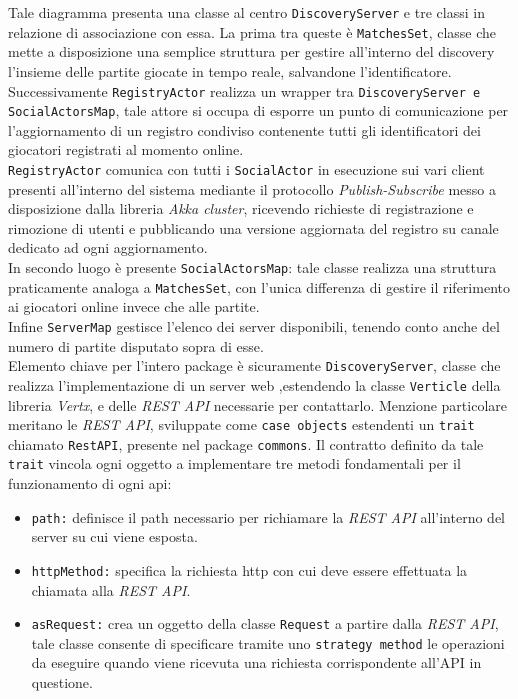 Tale diagramma presenta una classe al centro \texttt{DiscoveryServer} e tre classi in relazione di associazione con essa.
La prima tra queste è \texttt{MatchesSet}, classe che mette a disposizione una semplice struttura per gestire all'interno del discovery l'insieme delle partite giocate in tempo reale, salvandone l'identificatore.\\
Successivamente \texttt{RegistryActor} realizza un wrapper tra \texttt{DiscoveryServer e SocialActorsMap}, tale attore si occupa di esporre un punto di comunicazione per l'aggiornamento di un registro condiviso contenente tutti gli identificatori dei giocatori registrati al momento online.\\ \texttt{RegistryActor} comunica con tutti i \texttt{SocialActor} in esecuzione sui vari client presenti all'interno del sistema mediante il protocollo \textit{Publish-Subscribe} messo a disposizione dalla libreria \textit{Akka cluster}, ricevendo richieste di registrazione e rimozione di utenti e pubblicando una versione aggiornata del registro su canale dedicato ad ogni aggiornamento.\\
In secondo luogo è presente \texttt{SocialActorsMap}: tale classe realizza una struttura praticamente analoga a \texttt{MatchesSet}, con l'unica differenza di gestire il riferimento ai giocatori online invece che alle partite.\\
Infine \texttt{ServerMap} gestisce l'elenco dei server disponibili, tenendo conto anche del numero di partite disputato sopra di esse.\\
Elemento chiave per l'intero package è sicuramente \texttt{DiscoveryServer}, classe che realizza l'implementazione di un server web ,estendendo la classe \texttt{Verticle} della libreria \textit{Vertx}, e delle \textit{REST API} necessarie per contattarlo.
Menzione particolare meritano le \textit{REST API}, sviluppate come \texttt{case objects} estendenti un \texttt{trait} chiamato \texttt{RestAPI}, presente nel package \texttt{commons}. Il contratto definito da tale \texttt{trait} vincola ogni oggetto a implementare tre metodi fondamentali per il funzionamento di ogni api:
\begin{itemize}
  \item{\texttt{path:}} definisce il path necessario per richiamare la \textit{REST API} all'interno del server su cui viene esposta.

  \item{\texttt{httpMethod:}} specifica la richiesta http con cui deve essere effettuata la chiamata alla \textit{REST API}.

  \item{\texttt{asRequest:}} crea un oggetto della classe \texttt{Request} a partire dalla \textit{REST API}, tale classe consente di specificare tramite uno \texttt{strategy method} le operazioni da eseguire quando viene ricevuta una richiesta corrispondente all'API in questione.
\end{itemize}


